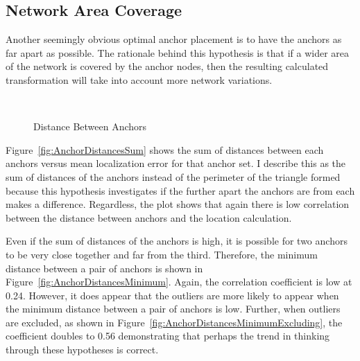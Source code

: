 \subsection{Network Area Coverage}

Another seemingly obvious optimal anchor placement is to have the anchors as far apart as possible.  The rationale behind this hypothesis is that if a wider area of the network is covered by the anchor nodes, then the resulting calculated transformation will take into account more network variations.  

\begin{figure}
  \centering
		\\
	\caption{Distance Between Anchors}
    \label{fig:AnchorDistances}
\end{figure}

Figure~\ref{fig:AnchorDistancesSum} shows the sum of distances between each anchors versus mean localization error for that anchor set. I describe this as the sum of distances of the anchors instead of the perimeter of the triangle formed because this hypothesis investigates if the further apart the anchors are from each makes a difference. Regardless, the plot shows that again there is low correlation between the distance between anchors and the location calculation.  

Even if the sum of distances of the anchors is high, it is possible for two anchors to be very close together and far from the third.  Therefore, the minimum distance between a pair of anchors is shown in Figure~\ref{fig:AnchorDistancesMinimum}.  Again, the correlation coefficient is low at 0.24.  However, it does appear that the outliers are more likely to appear when the minimum distance between a pair of anchors is low.  Further, when outliers are excluded, as shown in Figure~\ref{fig:AnchorDistancesMinimumExcluding}, the coefficient doubles to 0.56 demonstrating that perhaps the trend in thinking through these hypotheses is correct.

